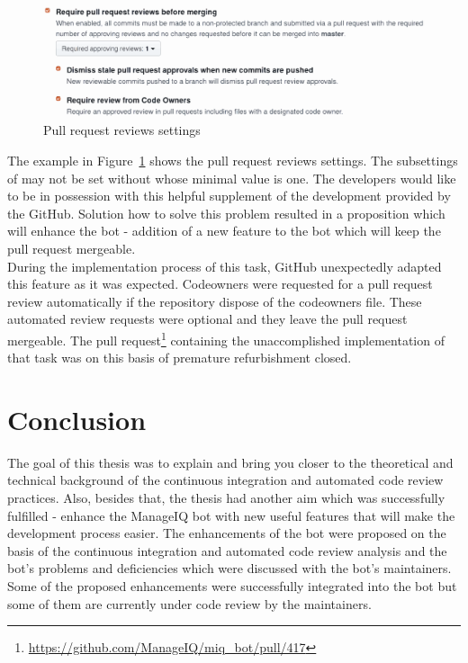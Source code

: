 \begin{figure}[H]
    \centering
    \includegraphics[scale=0.25]{img/codeowners_settings.pdf}
    \caption{Pull request reviews settings}
    \label{fig:codeowners_settings}
\end{figure}

The example in Figure~\ref{fig:codeowners_settings} shows the pull request reviews settings. The subsettings of  may not be set without  whose minimal value is one. The developers would like to be in possession with this helpful supplement of the development provided by the GitHub. Solution how to solve this problem resulted in a proposition which will enhance the bot - addition of a new feature to the bot which will keep the pull request mergeable.\\

During the implementation process of this task, GitHub unexpectedly adapted this feature as it was expected. Codeowners were requested for a pull request review automatically if the repository dispose of the codeowners file. These automated review requests were optional and they leave the pull request mergeable. The pull request\footnote{\url{https://github.com/ManageIQ/miq_bot/pull/417}} containing the unaccomplished implementation of that task was on this basis of premature refurbishment closed.

\chapter{Conclusion}

The goal of this thesis was to explain and bring you closer to the theoretical and technical background of the continuous integration and automated code review practices. Also, besides that, the thesis had another aim which was successfully fulfilled - enhance the ManageIQ bot with new useful features that will make the development process easier. The enhancements of the bot were proposed on the basis of the continuous integration and automated code review analysis and the bot's problems and deficiencies which were discussed with the bot's maintainers. Some of the proposed enhancements were successfully integrated into the bot but some of them are currently under code review by the maintainers.\\

